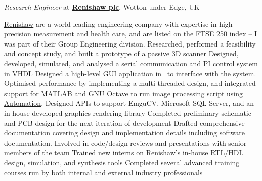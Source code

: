 \documentclass[a4paper,10pt,oneside]{article}
\begin{document}
\begin{body}
\textit{Research Engineer} at
\href{https://www.renishaw.com/}
{\textbf{Renishaw plc}},
Wotton-under-Edge, UK
\hfill
{} --
{}
\begin{detailwithoutsubheading}
\href{https://www.renishaw.com/}{Renishaw} are a world leading engineering company with expertise in high-precision measurement and health care, and are listed on the FTSE 250 index -- I was part of their Group Engineering division.
\BulletItem
Researched, performed a feasibility and concept study, and built a prototype of a passive 3D scanner
\BulletItem
Designed, developed, simulated, and analysed a serial communication and PI control system in VHDL 
\BulletItem
Designed a high-level GUI application in \Csharp \ to interface with the system. Optimised performance by implementing a multi-threaded design, and integrated support for MATLAB and GNU Octave to run image processing script using \href{https://msdn.microsoft.com/en-us/library/windows/desktop/ms221375(v=vs.85).aspx}{Automation}. Designed APIs to support EmguCV, Microsoft SQL Server, and an in-house developed graphics rendering library
\BulletItem
Completed preliminary schematic and PCB design for the next iteration of development
\BulletItem
Drafted comprehensive documentation covering design and implementation details including software documentation. Involved in code/design reviews and presentations with senior members of the team
\BulletItem
Trained new interns on Renishaw's in-house RTL/HDL design, simulation, and synthesis tools
\BulletItem
Completed several advanced training courses run by both internal and external industry professionals
\end{detailwithoutsubheading}


\end{body}
\end{document}
